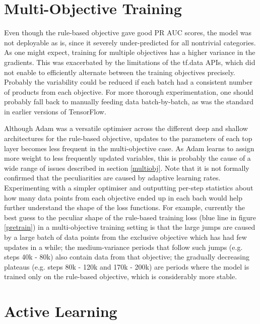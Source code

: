 \section{Multi-Objective Training}

Even though the rule-based objective gave good PR AUC scores, the model was not deployable as is, since it severely under-predicted for all nontrivial categories.
As one might expect, training for multiple objectives has a higher variance in the gradients.
This was exacerbated by the limitations of the tf.data APIs, which did not enable to efficiently alternate between the training objectives precisely.
Probably the variability could be reduced if each batch had a consistent number of products from each objective.
For more thorough experimentation, one should probably fall back to manually feeding data batch-by-batch, as was the standard in earlier versions of TensorFlow.

Although Adam was a versatile optimiser across the different deep and shallow architectures for the rule-based objective, updates to the parameters of each top layer becomes less frequent in the multi-objective case.
As Adam learns to assign more weight to less frequently updated variables, this is probably the cause of a wide range of issues described in section \ref{multiobj}.
Note that it is not formally confirmed that the peculiarities are caused by adaptive learning rates.
Experimenting with a simpler optimiser and outputting per-step statistics about how many data points from each objective ended up in each bach would help further understand the shape of the loss functions.
For example, currently the best guess to the peculiar shape of the rule-based training loss (blue line in figure \ref{pretrain}) in a multi-objective training setting is that the large jumps are caused by a large batch of data points from the exclusive objective which has had few updates in a while; the medium-variance periods that follow such jumps (e.g. steps 40k - 80k) also contain data from that objective; the gradually decreasing plateaus (e.g. steps 80k - 120k and 170k - 200k) are periods where the model is trained only on the rule-based objective, which is considerably more stable.

\section{Active Learning}
